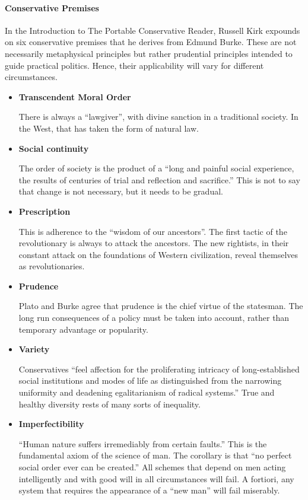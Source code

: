 \paragraph{Conservative Premises}


In the Introduction to The Portable Conservative Reader, Russell Kirk expounds on six conservative premises that he derives from Edmund Burke. These are not necessarily metaphysical principles but rather prudential principles intended to guide practical politics. Hence, their applicability will vary for different circumstances.

\begin{itemize}


\item \textbf{Transcendent Moral Order}

There is always a ``lawgiver'', with divine sanction in a traditional society. In the West, that has taken the form of natural law.

\item \textbf{Social continuity}

The order of society is the product of a ``long and painful social experience, the results of centuries of trial and reflection and sacrifice.'' This is not to say that change is not necessary, but it needs to be gradual.

\item \textbf{Prescription}

This is adherence to the ``wisdom of our ancestors''. The first tactic of the revolutionary is always to attack the ancestors. The new rightists, in their constant attack on the foundations of Western civilization, reveal themselves as revolutionaries.

\item \textbf{Prudence}

Plato and Burke agree that prudence is the chief virtue of the statesman. The long run consequences of a policy must be taken into account, rather than temporary advantage or popularity.

\item \textbf{Variety}

Conservatives ``feel affection for the proliferating intricacy of long-established social institutions and modes of life as distinguished from the narrowing uniformity and deadening egalitarianism of radical systems.'' True and healthy diversity rests of many sorts of inequality.

\item \textbf{Imperfectibility}

``Human nature suffers irremediably from certain faults.'' This is the fundamental axiom of the science of man. The corollary is that ``no perfect social order ever can be created.'' All schemes that depend on men acting intelligently and with good will in all circumstances will fail. A fortiori, any system that requires the appearance of a ``new man'' will fail miserably.
\end{itemize}


